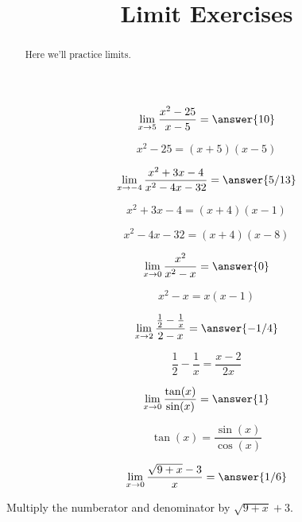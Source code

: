 \documentclass[handout]{ximera}
\title{Limit Exercises}
\begin{document}
\begin{abstract}
  Here we'll practice limits.
\end{abstract}
\maketitle

\begin{exercise}
\[\lim_{x \to 5} \frac{x^2-25}{x-5} = \answer{10}\]
\begin{hint}
	\[x^2-25 = (x+5)(x-5)\]
\end{hint}
\end{exercise}


\begin{exercise}
\[\lim_{x \to -4} \frac{x^2+3x-4}{x^2-4x-32} = \answer{5/13}\]
\begin{hint}
	\[x^2+3x-4 = (x+4)(x-1)\]
\end{hint}
\begin{hint}
	\[x^2-4x-32 = (x+4)(x-8)\]
\end{hint}
\end{exercise}

\begin{exercise}
\[\lim_{x \to 0} \frac{x^2}{x^2-x} = \answer{0}\]
\begin{hint}
	\[x^2-x = x(x-1)\]
\end{hint}

\end{exercise}

\begin{exercise}
\[\lim_{x \to 2} \frac{\frac{1}{2}-\frac{1}{x}}{2-x} = \answer{-1/4}\]
\begin{hint}
	\[\frac{1}{2}-\frac{1}{x} = \frac{x-2}{2x} \]
\end{hint}
\end{exercise}

\begin{exercise}
\[\lim_{x \to 0} \frac{\tan(x)}{\sin(x)} = \answer{1}\]
\begin{hint}
	\[\tan(x) = \frac{\sin(x)}{\cos(x)}\]
\end{hint}
\end{exercise}

\begin{exercise}
\[\lim_{x \to 0} \frac{\sqrt{9+x}-3}{x} = \answer{1/6}\]
\begin{hint}
	Multiply the numberator and denominator by $\sqrt{9+x}+3$.
\end{hint}
\end{exercise}
\end{document}
